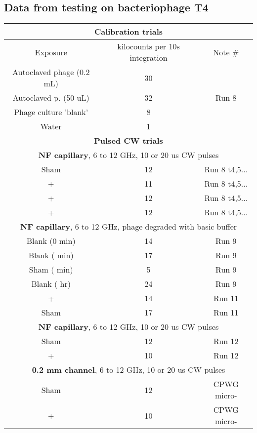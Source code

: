 \documentclass[paper.tex]{subfiles}
\begin{document}
\subsection{Data from testing on bacteriophage T4}
\begin{table}[h!]
	\centering
	\begin{tabular}{ |c|c|c| } 
				\hline
		\multicolumn{3}{|c|}{\textbf{Calibration trials} } \\
		\hline
		\hline
		Exposure & kilocounts per 10s integration & Note \# \\
		\hline
		Autoclaved phage (0.2 mL) & 30 & \\ 
		Autoclaved p. (50 uL) & 32 & Run 8\\ 
		\hline
		Phage culture 'blank' & 8 & \\ 
		Water & 1 & \\

		\hline
\multicolumn{3}{|c|}{\textbf{Pulsed CW trials}} \\
\hline


		\hline
		\multicolumn{3}{|c|}{\textbf{NF capillary}, 6 to 12 GHz, 10 or 20 us CW pulses} \\
		\hline
		Sham   & 12 & Run 8 t4,5...\\
		+ & 11 & Run 8 t4,5...\\
		+  & 12 & Run 8 t4,5...\\
		+  & 12 & Run 8 t4,5...\\
		\hline
		\multicolumn{3}{|c|}{\textbf{NF capillary}, 6 to 12 GHz, phage degraded with basic buffer} \\
		\hline
		Blank (0 min) & 14 & Run 9\\
		Blank (\ntilde 15 min) & 17 & Run 9\\
		Sham (\ntilde 15 min) & 5 & Run 9\\
		Blank (\ntilde 4 hr) & 24 & Run 9\\
		\hline
		+  & 14 & Run 11\\
		Sham & 17 & Run 11\\
		\hline
		\multicolumn{3}{|c|}{\textbf{NF capillary}, 6 to 12 GHz, 10 or 20 us CW pulses} \\
		\hline
		Sham & 12 & Run 12\\
		+    & 10 & Run 12\\
		\hline
		\multicolumn{3}{|c|}{\textbf{0.2 mm channel}, 6 to 12 GHz, 10 or 20 us CW pulses} \\
		\hline
		 Sham & 12 & CPWG micro-\\
 		 +    & 10 & CPWG micro-\\


\end{tabular}
\end{table}
\end{document}
